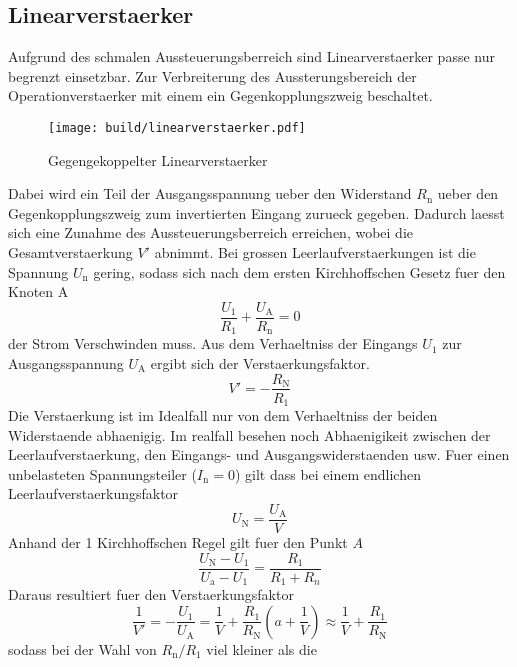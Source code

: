 \subsection{Linearverstaerker}%
\label{sub:linearverstaerker}
Aufgrund des schmalen Aussteuerungsberreich sind Linearverstaerker passe nur
begrenzt einsetzbar.
Zur Verbreiterung des Aussterungsbereich der Operationverstaerker mit einem 
ein Gegenkopplungszweig beschaltet.
\begin{figure}[h]
		\centering
		\texttt{[image: build/linearverstaerker.pdf]}
		\caption{Gegengekoppelter Linearverstaerker \cite{anleitung}}
		\label{fig:lin}
\end{figure}
Dabei wird ein Teil der Ausgangsspannung ueber den Widerstand $R_\text{n}$ ueber
den Gegenkopplungszweig zum invertierten Eingang zurueck gegeben. 
Dadurch laesst sich eine Zunahme des Aussteuerungsberreich erreichen, wobei die
Gesamtverstaerkung $V'$ abnimmt.
Bei grossen Leerlaufverstaerkungen ist die Spannung $U_\text{n}$ gering, sodass
sich nach dem ersten Kirchhoffschen Gesetz fuer den Knoten A
\begin{equation}
		\frac{U_1}{R_1} + \frac{U_\text{A}}{R_\text{n}} = 0
\end{equation}
der Strom Verschwinden muss. 
Aus dem Verhaeltniss der Eingangs $U_1$ zur Ausgangsspannung $U_\text{A}$ ergibt
sich der Verstaerkungsfaktor.
\begin{equation}
		V' = - \frac{R_\text{N}}{R_1}
\end{equation}
Die Verstaerkung ist im Idealfall nur von dem Verhaeltniss der beiden
Widerstaende abhaenigig. 
Im realfall besehen noch Abhaenigikeit zwischen der Leerlaufverstaerkung, den
Eingangs- und Ausgangswiderstaenden usw. 
Fuer einen unbelasteten Spannungsteiler ($I_\text{n} = 0$) gilt dass bei einem
endlichen Leerlaufverstaerkungsfaktor
\begin{equation}
		U_\text{N} = \frac{U_\text{A}}{V}	
\end{equation}
Anhand der 1 Kirchhoffschen Regel gilt fuer den Punkt $A$
\begin{equation}
		\frac{U_\text{N}-U_1}{U_\text{a}-U_1} = \frac{R_1}{R_1 + R_n}
\end{equation}
Daraus resultiert fuer den Verstaerkungsfaktor 
\begin{equation}
		\frac{1}{V'}= - \frac{U_1}{U_\text{A}} = \frac{1}{V} +
		\frac{R_1}{R_\text{N}} \left( a + \frac{1}{V} \right) \approx
		\frac{1}{V} + \frac{R_1}{R_\text{N}}
\end{equation}
sodass bei der Wahl von $R_\text{n}/ R_\text{1}$ viel kleiner als die
